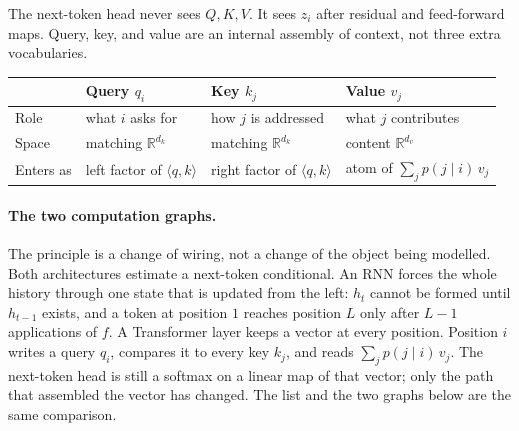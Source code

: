 \documentclass[11pt,a4paper]{article}
\theoremstyle{definition}
\begin{document}
\begin{remark}
The next-token head never sees \(Q,K,V\). It sees \(z_i\) after residual and feed-forward maps. Query, key, and value are an internal assembly of context, not three extra vocabularies.

{\small
\setlength{\tabcolsep}{3.2pt}
\renewcommand{\arraystretch}{1.14}
\begin{center}
\begin{tabularx}{\linewidth}{|
  >{\raggedright\arraybackslash}p{2.15cm}|
  >{\raggedright\arraybackslash}X|
  >{\raggedright\arraybackslash}X|
  >{\raggedright\arraybackslash}X|
}
\hline
 & \textbf{Query \(q_i\)} & \textbf{Key \(k_j\)} & \textbf{Value \(v_j\)} \\
\hline
Role & what \(i\) asks for & how \(j\) is addressed & what \(j\) contributes \\
\hline
Space & matching \(\mathbb{R}^{d_k}\) & matching \(\mathbb{R}^{d_k}\) & content \(\mathbb{R}^{d_v}\) \\
\hline
Enters as & left factor of \(\langle q,k\rangle\) & right factor of \(\langle q,k\rangle\) & atom of \(\sum_j p(j\mid i)\,v_j\) \\
\hline
\end{tabularx}
\end{center}
}
\end{remark}

\paragraph{The two computation graphs.}
The principle is a change of wiring, not a change of the object being modelled. Both architectures estimate a next-token conditional. An RNN forces the whole history through one state that is updated from the left: \(h_t\) cannot be formed until \(h_{t-1}\) exists, and a token at position \(1\) reaches position \(L\) only after \(L-1\) applications of \(f\). A Transformer layer keeps a vector at every position. Position \(i\) writes a query \(q_i\), compares it to every key \(k_j\), and reads \(\sum_j p(j\mid i)\,v_j\). The next-token head is still a softmax on a linear map of that vector; only the path that assembled the vector has changed. The list and the two graphs below are the same comparison.
\end{document}
